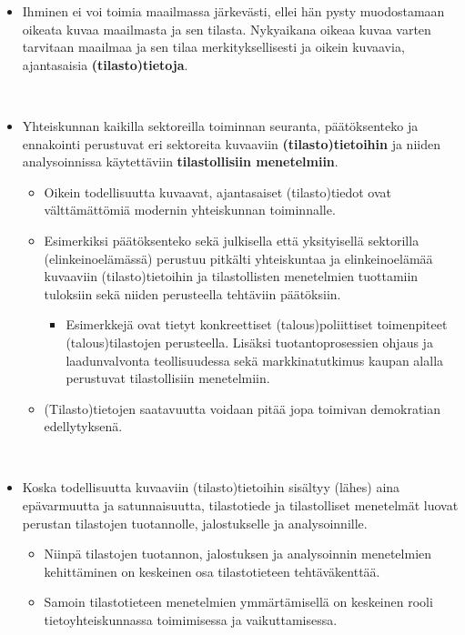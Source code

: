 \documentclass[
]{book}
\providecommand{\tightlist}{%
  \setlength{\itemsep}{0pt}\setlength{\parskip}{0pt}}
\begin{document}
\begin{itemize}
\tightlist
\item
  Ihminen ei voi toimia maailmassa järkevästi, ellei hän pysty muodostamaan oikeata kuvaa maailmasta ja sen tilasta. Nykyaikana oikeaa kuvaa varten tarvitaan maailmaa ja sen tilaa merkityksellisesti ja oikein kuvaavia, ajantasaisia \textbf{(tilasto)tietoja}.\\
  \strut \\
\item
  Yhteiskunnan kaikilla sektoreilla toiminnan seuranta, päätöksenteko ja ennakointi perustuvat eri sektoreita kuvaaviin \textbf{(tilasto)tietoihin} ja niiden analysoinnissa käytettäviin \textbf{tilastollisiin menetelmiin}.

  \begin{itemize}
  \tightlist
  \item
    Oikein todellisuutta kuvaavat, ajantasaiset (tilasto)tiedot ovat välttämättömiä modernin yhteiskunnan toiminnalle.
  \item
    Esimerkiksi päätöksenteko sekä julkisella että yksityisellä sektorilla (elinkeinoelämässä) perustuu pitkälti yhteiskuntaa ja elinkeinoelämää kuvaaviin (tilasto)tietoihin ja tilastollisten menetelmien tuottamiin tuloksiin sekä niiden perusteella tehtäviin päätöksiin.

    \begin{itemize}
    \tightlist
    \item
      Esimerkkejä ovat tietyt konkreettiset (talous)poliittiset toimenpiteet (talous)tilastojen perusteella. Lisäksi tuotantoprosessien ohjaus ja laadunvalvonta teollisuudessa sekä markkinatutkimus kaupan alalla perustuvat tilastollisiin menetelmiin.
    \end{itemize}
  \item
    (Tilasto)tietojen saatavuutta voidaan pitää jopa toimivan demokratian edellytyksenä.\\
    \strut \\
  \end{itemize}
\item
  Koska todellisuutta kuvaaviin (tilasto)tietoihin sisältyy (lähes) aina epävarmuutta ja satunnaisuutta, tilastotiede ja tilastolliset menetelmät luovat perustan tilastojen tuotannolle, jalostukselle ja analysoinnille.

  \begin{itemize}
  \tightlist
  \item
    Niinpä tilastojen tuotannon, jalostuksen ja analysoinnin menetelmien kehittäminen on keskeinen osa tilastotieteen tehtäväkenttää.
  \item
    Samoin tilastotieteen menetelmien ymmärtämisellä on keskeinen rooli tietoyhteiskunnassa toimimisessa ja vaikuttamisessa.\\
    \strut \\
  \end{itemize}
\end{itemize}
\end{document}
